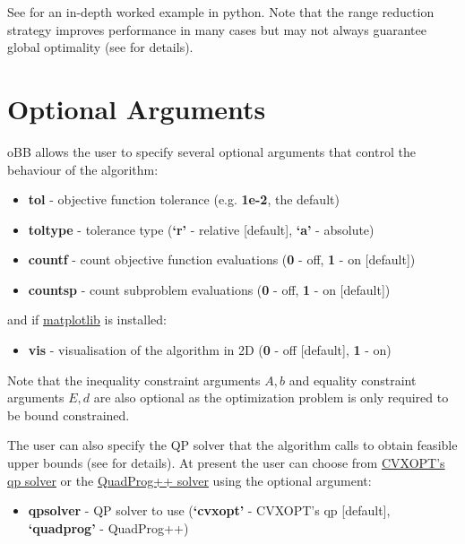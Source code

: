 \documentclass[letterpaper,11pt,openany,oneside]{sphinxmanual}
\begin{document}
See {\hyperref[userguide:example\string-of\string-use]{}} for an in-depth worked example in python. Note that the range reduction strategy improves performance in many cases but may not always guarantee global optimality (see \label{userguide:id6}{\hyperref[userguide:g2015]{\crossref{{[}G2015{]}}}} for details).


\section{Optional Arguments}
\label{userguide:optional-arguments}
oBB allows the user to specify several optional arguments that control the behaviour of the algorithm:
\begin{itemize}
\item {} 
\textbf{tol} - objective function tolerance (e.g. \textbf{1e-2}, the default)

\item {} 
\textbf{toltype} - tolerance type (\textbf{`r'} - relative {[}default{]}, \textbf{`a'} - absolute)

\item {} 
\textbf{countf} - count objective function evaluations (\textbf{0} - off, \textbf{1} - on {[}default{]})

\item {} 
\textbf{countsp} - count subproblem evaluations (\textbf{0} - off, \textbf{1} - on {[}default{]})

\end{itemize}

and if \href{http://www.matplotlib.org/}{matplotlib} is installed:
\begin{itemize}
\item {} 
\textbf{vis} - visualisation of the algorithm in 2D (\textbf{0} - off {[}default{]}, \textbf{1} - on)

\end{itemize}

Note that the inequality constraint arguments \(A, b\) and  equality constraint arguments \(E, d\) are also optional as the optimization problem is only required to be bound constrained.

The user can also specify the QP solver that the algorithm calls to obtain feasible upper bounds (see \label{userguide:id7}{\hyperref[userguide:cfg2013]{\crossref{{[}CFG2013{]}}}} for details). At present the user can choose from \href{http://cvxopt.org/}{CVXOPT's qp solver} or the \href{http://github.com/mpy/PyQuadProg/}{QuadProg++ solver} using the optional argument:
\begin{itemize}
\item {} 
\textbf{qpsolver} - QP solver to use (\textbf{`cvxopt'} - CVXOPT's qp {[}default{]}, \textbf{`quadprog'} - QuadProg++)

\end{itemize}
\end{document}

